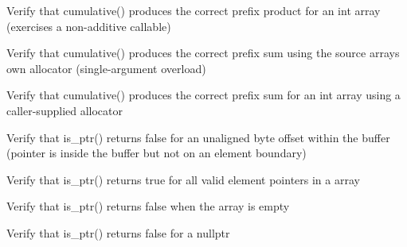 \begin{DoxyRefList}
%
Verify that cumulative() produces the correct prefix product for an int array (exercises a non-\/additive callable)  
\item[Global \doxylink{test__array_8cpp_ad25ca859ad1665f7b544322cc2c8e881}{TEST\+\_\+F} (\doxylink{classArrayInitTest}{Array\+Init\+Test}, Cumulative\+Int\+Sum\+With\+Source\+Allocator)]\label{test__test000093}%
%
Verify that cumulative() produces the correct prefix sum using the source array\textquotesingle{}s own allocator (single-\/argument overload)  
\item[Global \doxylink{test__array_8cpp_a7bf0404694dff0286710bbb8b2d48240}{TEST\+\_\+F} (\doxylink{classArrayInitTest}{Array\+Init\+Test}, Cumulative\+Int\+Sum\+With\+Allocator)]\label{test__test000092}%
%
Verify that cumulative() produces the correct prefix sum for an int array using a caller-\/supplied allocator  
\item[Global \doxylink{test__array_8cpp_aea54b591383f1f4a1103c161c7ec7dfa}{TEST\+\_\+F} (\doxylink{classArrayInitTest}{Array\+Init\+Test}, Is\+Ptr\+False\+For\+Unaligned\+Pointer)]\label{test__test000091}%
%
Verify that is\+\_\+ptr() returns false for an unaligned byte offset within the buffer (pointer is inside the buffer but not on an element boundary)  
\item[Global \doxylink{test__array_8cpp_a0b0922fbf1342233e3b58f669f5c9ef5}{TEST\+\_\+F} (\doxylink{classArrayInitTest}{Array\+Init\+Test}, Is\+Ptr\+True\+For\+All\+Point\+Elements)]\label{test__test000090}%
%
Verify that is\+\_\+ptr() returns true for all valid element pointers in a  array  
\item[Global \doxylink{test__array_8cpp_aa28360a9eb88e59ffd83fd31ede017e9}{TEST\+\_\+F} (\doxylink{classArrayInitTest}{Array\+Init\+Test}, Is\+Ptr\+False\+When\+Array\+Is\+Empty)]\label{test__test000089}%
%
Verify that is\+\_\+ptr() returns false when the array is empty  
\item[Global \doxylink{test__array_8cpp_a564f5ad5e62aded81b1f9383eb8f80ef}{TEST\+\_\+F} (\doxylink{classArrayInitTest}{Array\+Init\+Test}, Is\+Ptr\+False\+For\+Nullptr)]\label{test__test000088}%
%
Verify that is\+\_\+ptr() returns false for a nullptr  
\item[Global \doxylink{test__array_8cpp_a7c6ee94df696d7db5bb7870e07983e9f}{TEST\+\_\+F} (\doxylink{classArrayInitTest}{Array\+Init\+Test}, Is\+Ptr\+False\+For\+Pointer\+Before\+Buffer)]\label{test__test000087}%

\end{DoxyRefList}
